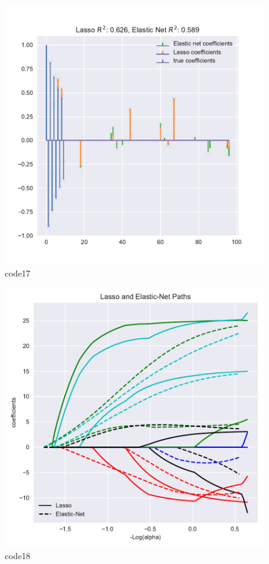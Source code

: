 \begin{PythonCode}\label{例12}
	
\end{PythonCode}

\begin{figure}[htbp]
	\centering
	\includegraphics[width=14cm]{codeimage/code17}
	\caption{code17}
	\label{code17}
\end{figure}

\begin{PythonCode}\label{例13}
	
\end{PythonCode}

\begin{figure}[htbp]
	\centering
	\includegraphics[width=14cm]{codeimage/code18}
	\caption{code18}
	\label{code18}
\end{figure}

